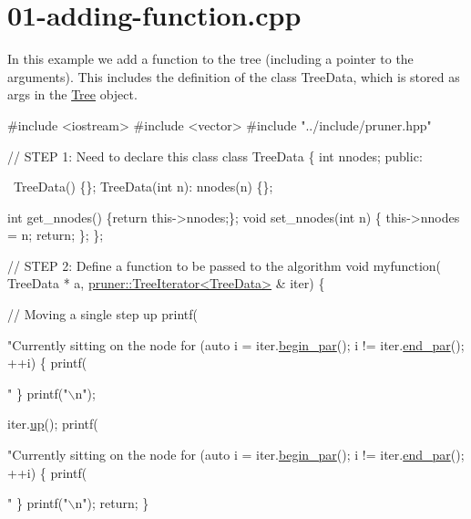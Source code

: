 \hypertarget{01-adding-function_8cpp-example}{}\section{01-\/adding-\/function.\+cpp}
In this example we add a function to the tree (including a pointer to the arguments). This includes the definition of the class Tree\+Data, which is stored as args in the \hyperlink{classTree}{Tree} object.


\begin{DoxyCodeInclude}
\textcolor{preprocessor}{#include <iostream>}
\textcolor{preprocessor}{#include <vector>}
\textcolor{preprocessor}{#include "../include/pruner.hpp"}

\textcolor{comment}{// STEP 1: Need to declare this class}
\textcolor{keyword}{class }TreeData \{
  \textcolor{keywordtype}{int} nnodes;
\textcolor{keyword}{public}:
  
  ~TreeData() \{\};
  TreeData(\textcolor{keywordtype}{int} n): nnodes(n) \{\};
  
  \textcolor{keywordtype}{int} get\_nnodes() \{\textcolor{keywordflow}{return} this->nnodes;\};
  \textcolor{keywordtype}{void} set\_nnodes(\textcolor{keywordtype}{int} n) \{
    this->nnodes = n;
    \textcolor{keywordflow}{return};
  \};
\};

\textcolor{comment}{// STEP 2: Define a function to be passed to the algorithm}
\textcolor{keywordtype}{void} myfunction(
    TreeData * a,
    \hyperlink{classpruner_1_1TreeIterator}{pruner::TreeIterator<TreeData>} & iter) \{
  
  \textcolor{comment}{// Moving a single step up}
  printf(\textcolor{stringliteral}{"Currently sitting on the node %
  \textcolor{keywordflow}{for} (\textcolor{keyword}{auto} i = iter.\hyperlink{classpruner_1_1TreeIterator_ad1435c13e19ed83e6222285753996567}{begin\_par}(); i != iter.\hyperlink{classpruner_1_1TreeIterator_aec582d1a4bf6b892532d41f1f9b8044d}{end\_par}(); ++i) \{
    printf(\textcolor{stringliteral}{" %
  \}
  printf(\textcolor{stringliteral}{"\(\backslash\)n"});
  
  iter.\hyperlink{classpruner_1_1TreeIterator_af7f80d5909938115bf9e6455ac8950b3}{up}();
  printf(\textcolor{stringliteral}{"Currently sitting on the node %
  \textcolor{keywordflow}{for} (\textcolor{keyword}{auto} i = iter.\hyperlink{classpruner_1_1TreeIterator_ad1435c13e19ed83e6222285753996567}{begin\_par}(); i != iter.\hyperlink{classpruner_1_1TreeIterator_aec582d1a4bf6b892532d41f1f9b8044d}{end\_par}(); ++i) \{
    printf(\textcolor{stringliteral}{" %
  \}
  printf(\textcolor{stringliteral}{"\(\backslash\)n"});
  \textcolor{keywordflow}{return};
\}

}}}}
\end{DoxyCodeInclude}
